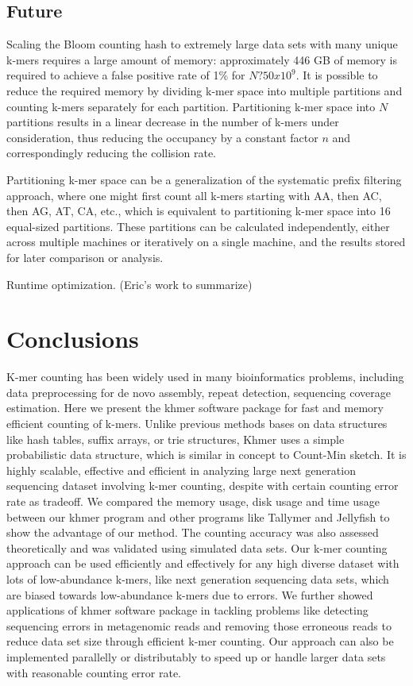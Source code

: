 \documentclass{article}
\begin{document}
\subsection{Future}


Scaling the Bloom counting hash to extremely large data sets with many
unique k-mers requires a large amount of memory: approximately 446 GB
of memory is required to achieve a false positive rate of 1\% for $N ?
50x10^9$. It is possible to reduce the required memory by dividing
k-mer space into multiple partitions and counting k-mers separately
for each partition. Partitioning k-mer space into $N$ partitions
results in a linear decrease in the number of k-mers under
consideration, thus reducing the occupancy by a constant factor $n$
and correspondingly reducing the collision rate.

Partitioning k-mer space can be a generalization of the systematic
prefix filtering approach, where one might first count all k-mers
starting with AA, then AC, then AG, AT, CA, etc., which is equivalent
to partitioning k-mer space into 16 equal-sized partitions. These
partitions can be calculated independently, either across multiple
machines or iteratively on a single machine, and the results stored
for later comparison or analysis.

Runtime optimization. (Eric's work to summarize)

\section{Conclusions}

K-mer counting has been widely used in many bioinformatics problems,
including data preprocessing for de novo assembly, repeat detection,
sequencing coverage estimation. Here we present the khmer software
package for fast and memory efficient counting of k-mers. Unlike
previous methods bases on data structures like hash tables, suffix
arrays, or trie structures, Khmer uses a simple probabilistic data
structure, which is similar in concept to Count-Min sketch. It is
highly scalable, effective and efficient in analyzing large next
generation sequencing dataset involving k-mer counting, despite with
certain counting error rate as tradeoff. We compared the memory usage,
disk usage and time usage between our khmer program and other programs
like Tallymer and Jellyfish to show the advantage of our method. The
counting accuracy was also assessed theoretically and was validated
using simulated data sets. Our k-mer counting approach can be used
efficiently and effectively for any high diverse dataset with lots of
low-abundance k-mers, like next generation sequencing data sets, which
are biased towards low-abundance k-mers due to errors. We further
showed applications of khmer software package in tackling problems
like detecting sequencing errors in metagenomic reads and removing
those erroneous reads to reduce data set size through efficient k-mer
counting. Our approach can also be implemented parallelly or
distributably to speed up or handle larger data sets with reasonable
counting error rate.
\end{document}
